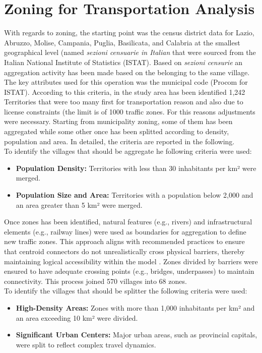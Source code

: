 \section{Zoning for Transportation Analysis}
With regards to zoning, the starting point was the census district data for Lazio, Abruzzo, Molise, Campania, Puglia, Basilicata, and Calabria at the smallest geographical level (named \textit{sezioni censuarie in Italian} that were sourced from the Italian National Institute of Statistics (ISTAT). Based on \textit{sezioni censurie} an aggregation activity has been made based on the belonging to the same village. The key attributes used for this operation was the municipal code (Procom for ISTAT). According to this criteria, in the study area has been identified 1,242 Territories that were too many first for transportation reason and also due to license constraints (the limit is of 1000 traffic zones. For this reasons adjustments were necessary.
Starting from municipality zoning, some of them has been aggregated while some other once has been splitted according to density, population and area. In detailed, the criteria are reported in the following.\\

To identify the villages that should be aggregate he following criteria were used:
\begin{itemize}
    \item \textbf{Population Density:} Territories with less than 30 inhabitants per km² were merged.
    \item \textbf{Population Size and Area:} Territories with a population below 2,000 and an area greater than 5 km² were merged.
\end{itemize}
Once zones has been identified, natural features (e.g., rivers) and infrastructural elements (e.g., railway lines) were used as boundaries for aggregation to define new traffic zones. This approach aligns with recommended practices to ensure that centroid connectors do not unrealistically cross physical barriers, thereby maintaining logical accessibility within the model \cite{Cambridge2007}. Zones divided by barriers were ensured to have adequate crossing points (e.g., bridges, underpasses) to maintain connectivity. This process joined 570 villages into 68 zones.\\
To identify the villages that should be splitter the following criteria were used:
\begin{itemize}
    \item \textbf{High-Density Areas:} Zones with more than 1,000 inhabitants per km² and an area exceeding 10 km² were divided.
    \item \textbf{Significant Urban Centers:} Major urban areas, such as provincial capitals, were split to reflect complex travel dynamics.
\end{itemize}


